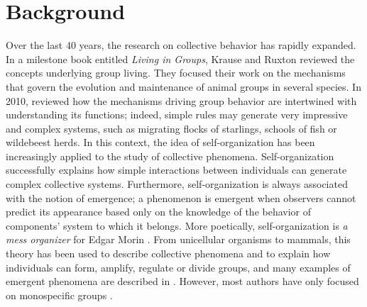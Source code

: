 	\section{Background}
Over the last 40 years, the research on collective behavior has rapidly expanded. In a milestone book entitled \textit{Living in Groups}, Krause and Ruxton \cite{krause_living_2002} reviewed the concepts underlying group living. They focused their work on the mechanisms that govern the evolution and maintenance of animal groups in several species. In 2010, \citet{sumpter_collective_2009} reviewed how the mechanisms driving group behavior are intertwined with understanding its functions; indeed, simple rules may generate very impressive and complex systems, such as migrating flocks of starlings, schools of fish or wildebeest herds. In this context, the idea of self-organization has been increasingly applied to the study of collective phenomena. Self-organization successfully explains how simple interactions between individuals can generate complex collective systems. Furthermore, self-organization is always associated with the notion of emergence; a phenomenon is emergent when observers cannot predict its appearance based only on the knowledge of the behavior of components' system to which it belongs. More poetically, self-organization is \textit{a mess organizer} for Edgar Morin \cite{morin_methode_1977}. From unicellular organisms to mammals, this theory has been used to describe collective phenomena and to explain how individuals can form, amplify, regulate or divide groups, and many examples of emergent phenomena are described in \citet{camazine_self-organization_2001}. However, most authors have only focused on monospecific groups \citep{stamps_conspecific_1988,camazine_self-organization_2001,sumpter_collective_2009,kivela_past_2014}.

